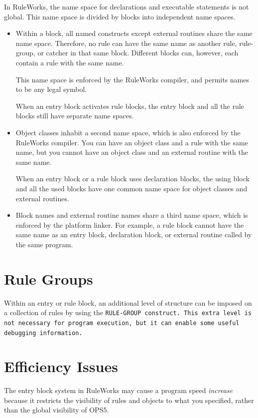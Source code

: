In RuleWorks, the name space for declarations and executable
statements is not global. This name space is divided by blocks into
independent name spaces.

\begin{itemize}
\item Within a block, all named constructs except external routines
  share the same name space. Therefore, no rule can have the same name
  as another rule, rule-group, or catcher in that same
  block. Different blocks can, however, each contain a rule with the
  same name.

  This name space is enforced by the RuleWorks compiler, and permits
  names to be any legal symbol.

  When an entry block activates rule blocks, the entry block and all
  the rule blocks still have separate name spaces.

\item Object classes inhabit a second name space, which is also
  enforced by the RuleWorks compiler. You can have an object class and
  a rule with the same name, but you cannot have an object class and
  an external routine with the same name.

  When an entry block or a rule block uses declaration blocks, the
  using block and all the used blocks have one common name space for
  object classes and external routines.

\item Block names and external routine names share a third name space,
  which is enforced by the platform linker. For example, a rule block
  cannot have the same name as an entry block, declaration block, or
  external routine called by the same program.
\end{itemize}
  
\section{Rule Groups}

Within an entry or rule block, an additional level of structure can be
imposed on a collection of rules by using the \tt{RULE-GROUP}
construct. This extra level is not necessary for program execution,
but it can enable some useful debugging information.

\section{Efficiency Issues}

The entry block system in RuleWorks may cause a program speed
\emph{increase} because it restricts the visibility of rules and
objects to what you specified, rather than the global visibility of
OPS5.

